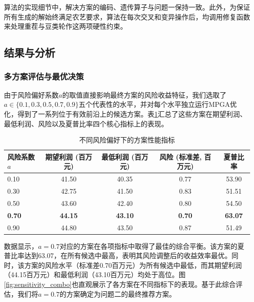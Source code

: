 算法的实现细节中，解决方案的编码、遗传算子与问题一保持一致。此外，为保证所有生成的解始终满足农艺要求，算法在每次交叉和变异操作后，均调用修复函数来处理重茬与豆类轮作这两项硬性约束。

\subsection{结果与分析}

\subsubsection{多方案评估与最优决策}
由于风险偏好系数$a$的取值直接影响最终方案的风险收益特征，我们选取了$a \in \{0.1, 0.3, 0.5, 0.7, 0.9\}$五个代表性的水平，并对每个水平独立运行MPGA优化，得到了一系列位于有效前沿上的候选方案。表\ref{tab:sensitivity_results}汇总了这些方案在期望利润、最低利润、风险以及夏普比率四个核心指标上的表现。

\begin{table}[H]
    \centering
    \caption{不同风险偏好下的方案性能指标}
    \label{tab:sensitivity_results}
    \begin{tabular}{@{}lcccc@{}}
        \toprule
        风险系数 $a$ & 期望利润 (百万元) & 最低利润 (百万元) & 风险 (标准差, 百万元) & 夏普比率 \\
        \midrule
        0.10 & 41.50 & 40.35 & 0.77 & 53.90 \\
        0.30 & 42.75 & 41.50 & 0.83 & 51.51 \\
        0.50 & 43.60 & 42.40 & 0.80 & 54.50 \\
        \textbf{0.70} & \textbf{44.15} & \textbf{43.10} & \textbf{0.70} & \textbf{63.07} \\
        0.90 & 44.80 & 43.50 & 0.87 & 51.49 \\
        \bottomrule
    \end{tabular}
\end{table}

数据显示，$a=0.7$对应的方案在各项指标中取得了最佳的综合平衡。该方案的夏普比率达到63.07，在所有候选中最高，表明其风险调整后的收益效率最优。同时，该方案的风险水平（标准差0.70百万元）为所有候选中最低，而其期望利润（44.15百万元）和最低利润（43.10百万元）均处于高位。图\ref{fig:sensitivity_combo}也直观展示了各方案在不同指标下的表现。基于此综合评估，我们将$a=0.7$的方案确定为问题二的最终推荐方案。

